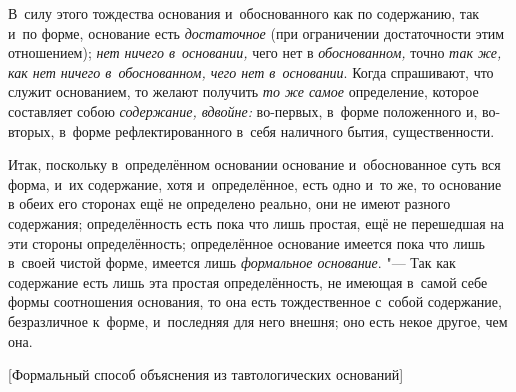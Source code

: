 В~силу этого тождества основания и~обоснованного как по содержанию, так и~по
форме, основание есть {\em достаточное} (при ограничении достаточности этим
отношением); {\em нет ничего в~основании,} чего нет в {\em обоснованном,} точно
{\em так же, как нет ничего в~обоснованном, чего нет в~основании}. Когда
спрашивают, что служит основанием, то желают получить {\em то же самое}
определение, которое составляет собою {\em содержание, вдвойне:} во-первых,
в~форме положенного и, во-вторых, в~форме рефлектированного в~себя наличного
бытия, существенности.

Итак, поскольку в~определённом основании основание и~обоснованное суть вся
форма, и~их содержание, хотя и~определённое, есть одно и~то же, то основание в
обеих его сторонах ещё не определено реально, они не имеют разного содержания;
определённость есть пока что лишь простая, ещё не перешедшая на эти стороны
определённость; определённое основание имеется пока что лишь в~своей чистой
форме, имеется лишь {\em формальное основание}. "--- Так как содержание есть
лишь эта простая определённость, не имеющая в~самой себе формы соотношения
основания, то она есть тождественное с~собой содержание, безразличное к~форме,
и~последняя для него внешня; оно есть некое другое, чем она.

%
{[Формальный способ объяснения из тавтологических оснований]}

